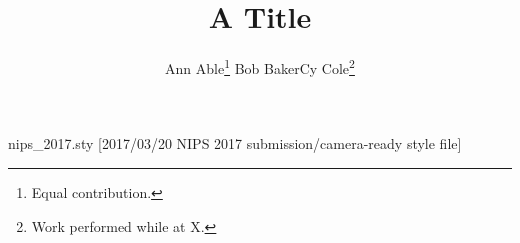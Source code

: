 \begin{filecontents*}[overwrite]{nips_2017.sty}
[2017/03/20 NIPS 2017 submission/camera-ready style file]
\providecommand{\maketitle}{}
\renewcommand{\maketitle}{%
  \par
  \begingroup
    \renewcommand{\thefootnote}{\fnsymbol{footnote}}
    \renewcommand{\@makefnmark}{\hbox to \z@{$^{\@thefnmark}$\hss}}
    \thispagestyle{empty}
    \@maketitle
    \@thanks
  \endgroup
  \let\maketitle\relax
  \let\thanks\relax
}
\providecommand{\@maketitle}{}
\renewcommand{\@maketitle}{\vbox{\hsize\textwidth\centering{\LARGE\bf \@title\par}
  \def\And{\end{tabular}\hfil\linebreak[0]\hfil\begin{tabular}[t]{c}\bf\rule{\z@}{24\p@}\ignorespaces}%
  \begin{tabular}[t]{c}\bf\rule{\z@}{24\p@}\@author\end{tabular}}}
\end{filecontents*}
\documentclass{article}
\usepackage{nips_2017}
\title{A Title}
\author{Ann Able\thanks{Equal contribution.} \And Bob Baker\footnotemark[1] \And Cy Cole\thanks{Work performed while at X.}}

\maketitle
Body.

